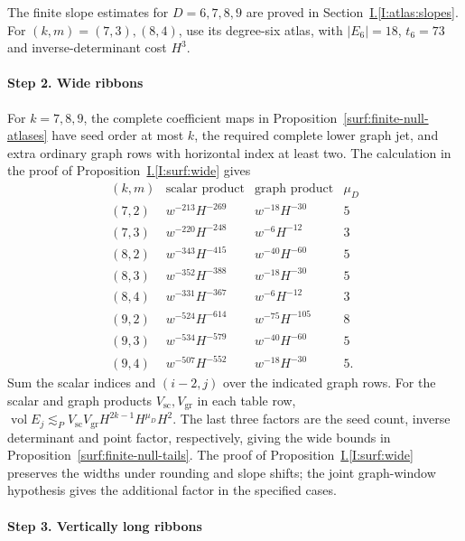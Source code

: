 \documentclass[11pt]{amsart}
\theoremstyle{definition}
\theoremstyle{remark}
\numberwithin{equation}{section}
\newcommand{\partIref}[1]{\hyperref[I:#1]{I.\ref*{I:#1}}}
\begin{document}
The finite slope estimates for $D=6,7,8,9$ are proved in Section~\partIref{atlas:slopes}. For $(k,m)=(7,3),(8,4)$, use its degree-six atlas, with $|E_6|=18$, $t_6=73$ and inverse-determinant cost $H^3$.

\paragraph{Step 2. Wide ribbons}

For $k=7,8,9$, the complete coefficient maps in Proposition~\ref{surf:finite-null-atlases} have seed order at most $k$, the required complete lower graph jet, and extra ordinary graph rows with horizontal index at least two. The calculation in the proof of Proposition~\partIref{surf:wide} gives
\[
\begin{array}{c|c|c|c}
(k,m)&\text{scalar product}&\text{graph product}&\mu_D\\\hline
(7,2)&w^{-213}H^{-269}&w^{-18}H^{-30}&5\\
(7,3)&w^{-220}H^{-248}&w^{-6}H^{-12}&3\\
(8,2)&w^{-343}H^{-415}&w^{-40}H^{-60}&5\\
(8,3)&w^{-352}H^{-388}&w^{-18}H^{-30}&5\\
(8,4)&w^{-331}H^{-367}&w^{-6}H^{-12}&3\\
(9,2)&w^{-524}H^{-614}&w^{-75}H^{-105}&8\\
(9,3)&w^{-534}H^{-579}&w^{-40}H^{-60}&5\\
(9,4)&w^{-507}H^{-552}&w^{-18}H^{-30}&5.
\end{array}
\]
Sum the scalar indices and $(i-2,j)$ over the indicated graph rows. For the scalar and graph products $V_{\mathrm{sc}},V_{\mathrm{gr}}$ in each table row, $\operatorname{vol}E_j\lesssim_P V_{\mathrm{sc}}V_{\mathrm{gr}}H^{2k-1}H^{\mu_D}H^2$. The last three factors are the seed count, inverse determinant and point factor, respectively, giving the wide bounds in Proposition~\ref{surf:finite-null-tails}. The proof of Proposition~\partIref{surf:wide} preserves the widths under rounding and slope shifts; the joint graph-window hypothesis gives the additional factor in the specified cases.

\paragraph{Step 3. Vertically long ribbons}
\end{document}
